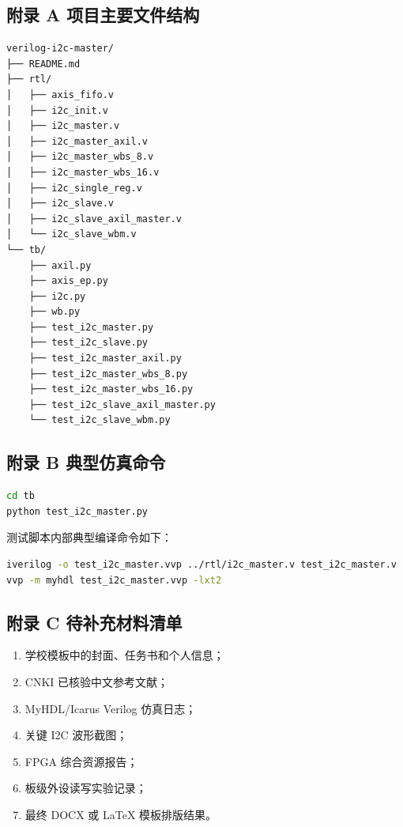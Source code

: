 \subsection{附录 A
项目主要文件结构}\label{ux9644ux5f55-a-ux9879ux76eeux4e3bux8981ux6587ux4ef6ux7ed3ux6784}

\begin{lstlisting}
verilog-i2c-master/
├── README.md
├── rtl/
│   ├── axis_fifo.v
│   ├── i2c_init.v
│   ├── i2c_master.v
│   ├── i2c_master_axil.v
│   ├── i2c_master_wbs_8.v
│   ├── i2c_master_wbs_16.v
│   ├── i2c_single_reg.v
│   ├── i2c_slave.v
│   ├── i2c_slave_axil_master.v
│   └── i2c_slave_wbm.v
└── tb/
    ├── axil.py
    ├── axis_ep.py
    ├── i2c.py
    ├── wb.py
    ├── test_i2c_master.py
    ├── test_i2c_slave.py
    ├── test_i2c_master_axil.py
    ├── test_i2c_master_wbs_8.py
    ├── test_i2c_master_wbs_16.py
    ├── test_i2c_slave_axil_master.py
    └── test_i2c_slave_wbm.py
\end{lstlisting}

\subsection{附录 B
典型仿真命令}\label{ux9644ux5f55-b-ux5178ux578bux4effux771fux547dux4ee4}

\begin{lstlisting}[language=bash]
cd tb
python test_i2c_master.py
\end{lstlisting}

测试脚本内部典型编译命令如下：

\begin{lstlisting}[language=bash]
iverilog -o test_i2c_master.vvp ../rtl/i2c_master.v test_i2c_master.v
vvp -m myhdl test_i2c_master.vvp -lxt2
\end{lstlisting}

\subsection{附录 C
待补充材料清单}\label{ux9644ux5f55-c-ux5f85ux8865ux5145ux6750ux6599ux6e05ux5355}

\begin{enumerate}
\def\labelenumi{\arabic{enumi}.}
\tightlist
\item
  学校模板中的封面、任务书和个人信息；
\item
  CNKI 已核验中文参考文献；
\item
  MyHDL/Icarus Verilog 仿真日志；
\item
  关键 I2C 波形截图；
\item
  FPGA 综合资源报告；
\item
  板级外设读写实验记录；
\item
  最终 DOCX 或 LaTeX 模板排版结果。
\end{enumerate}

